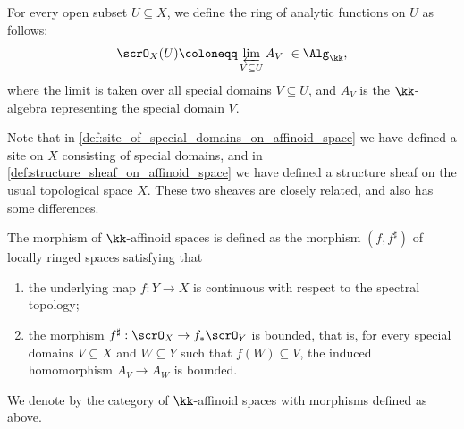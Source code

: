     \begin{definition}\label{def:structure_sheaf_on_affinoid_space}
        For every open subset \(U \subseteq X\), we define the ring of analytic functions on \(U\) as follows:
        \[ \scrO_X(U) \coloneqq \varprojlim_{V \subseteq U} A_V \ \in \Alg_{\kk}, \]
        where the limit is taken over all special domains \(V \subseteq U\), and \(A_V\) is the \(\kk\)-algebra representing the special domain \(V\).
    \end{definition}


    \begin{remark}\label{rmk:two_different_site_and_structure_sheaf_for_affinoid_spaces}
        Note that in \cref{def:site_of_special_domains_on_affinoid_space} we have defined a site on \(X\) consisting of special domains, 
        and in \cref{def:structure_sheaf_on_affinoid_space} we have defined a structure sheaf on the usual topological space \(X\).
        These two sheaves are closely related, and also has some differences.




    \end{remark}

    \begin{definition}\label{def:the_category_of_k_affinoid_space}
        The morphism of \(\kk\)-affinoid spaces is defined as the morphism \((f,f^\sharp)\) of locally ringed spaces 
        satisfying that
        \begin{enumerate}
            \item the underlying map \(f: Y \to X\) is continuous with respect to the spectral topology;
            \item the morphism \(f^\sharp: \scrO_X \to f_* \scrO_Y\) is bounded, that is, for every special domains \(V \subseteq X\) and \(W \subseteq Y\) such that \(f(W) \subseteq V\), the induced homomorphism \(A_V \to A_W\) is bounded.
        \end{enumerate}

        We denote by \Yang{} the category of \(\kk\)-affinoid spaces with morphisms defined as above.
    \end{definition}


